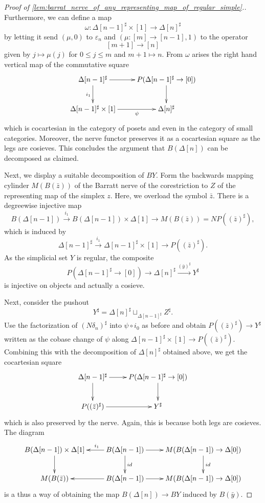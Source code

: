 \begin{proof}[Proof of \cref{lem:barrat_nerve_of_any_representing_map_of_regular_simple}.]
Furthermore, we can define a map
\[\omega :\Delta [n-1]^\sharp \times [1]\to \Delta [n]^\sharp\]
by letting it send $(\mu ,0)$ to $\varepsilon _n$ and $(\mu :[m]\to [n-1],1)$ to the operator
\[[m+1]\to [n]\]
given by $j\mapsto \mu (j)$ for $0\leq j\leq m$ and $m+1\mapsto n$. From $\omega$ arises the right hand vertical map of the commutative square
\begin{displaymath}
\xymatrix{
\Delta [n-1]^\sharp \ar[d]_{i_1} \ar[r] & P(\Delta [n-1]^\sharp \to [0]) \ar[d] \\
\Delta [n-1]^\sharp \times [1] \ar[r]_(.6)\psi & \Delta [n]^\sharp
}
\end{displaymath}
which is cocartesian in the category of posets and even in the category of small categories. Moreover, the nerve functor preserves it as a cocartesian square as the legs are cosieves. This concludes the argument that $B(\Delta [n])$ can be decomposed as claimed.

Next, we display a suitable decomposition of $BY$. Form the backwards mapping cylinder $M(B(\bar{z} ))$ of the Barratt nerve of the corestriction to $Z$ of the representing map of the simplex $z$. Here, we overload the symbol $\bar{z}$. There is a degreewise injective map
\[B(\Delta [n-1])\xrightarrow{i_1} B(\Delta [n-1])\times \Delta [1]\to M(B(\bar{z} ))=NP((\bar{z} )^\sharp ),\]
which is induced by
\[\Delta [n-1]^\sharp \xrightarrow{i_1} \Delta [n-1]^\sharp \times [1]\to P((\bar{z} )^\sharp ).\]
As the simplicial set $Y$ is regular, the composite
\[P(\Delta [n-1]^\sharp \to [0])\to \Delta [n]^\sharp \xrightarrow{(\bar{y} )^\sharp } Y^\sharp\]
is injective on objects and actually a cosieve.

Next, consider the pushout
\[Y^\sharp =\Delta [n]^\sharp \sqcup _{\Delta [n-1]^\sharp }Z^\sharp .\]
Use the factorization of $(N\delta _n)^\sharp$ into $\psi \circ i_0$ as before and obtain $P((\bar{z} )^\sharp )\to Y^\sharp$ written as the cobase change of $\psi$ along $\Delta [n-1]^\sharp \times [1]\to P((\bar{z} )^\sharp )$. Combining this with the decomposition of $\Delta [n]^\sharp$ obtained above, we get the cocartesian square
\begin{displaymath}
\xymatrix{
\Delta [n-1]^\sharp \ar[d] \ar[r] & P(\Delta [n-1]^\sharp \to [0]) \ar[d] \\
P((\bar{z} )^\sharp ) \ar[r] & Y^\sharp
}
\end{displaymath}
which is also preserved by the nerve. Again, this is because both legs are cosieves. The diagram
\begin{displaymath}
\xymatrix{
B(\Delta [n-1])\times \Delta [1] \ar[d] & B(\Delta [n-1]) \ar[l]_(.4){i_1} \ar[d]^{id} \ar[r] & M(B(\Delta [n-1])\to \Delta [0]) \ar[d]^{id} \\
M(B(\bar{z} )) & B(\Delta [n-1]) \ar[l] \ar[r] & M(B(\Delta [n-1])\to \Delta [0])
}
\end{displaymath}
is a thus a way of obtaining the map $B(\Delta [n])\to BY$ induced by $B(\bar{y} )$.


\end{proof}
